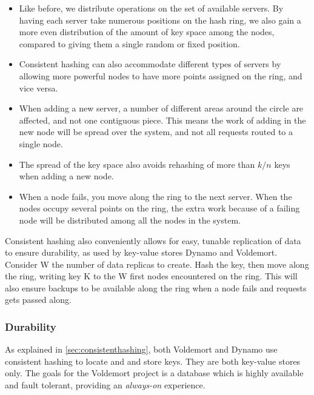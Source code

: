 \begin{itemize}
\item Like before, we distribute operations on the set of available servers. By having each server take numerous positions on the hash ring, we also gain a more even distribution of the amount of key space among the nodes, compared to giving them a single random or fixed position.

\item Consistent hashing can also accommodate different types of servers by allowing more powerful nodes to have more points assigned on the ring, and vice versa. 

\item When adding a new server, a number of different areas around the circle are affected, and not one contiguous piece. This means the work of adding in the new node will be spread over the system, and not all requests routed to a single node.

\item The spread of the key space also avoids rehashing of more than $k/n$ keys when adding a new node. 

\item When a node fails, you move along the ring to the next server. When the nodes occupy several points on the ring, the extra work because of a failing node will be distributed among all the nodes in the system.
\end{itemize}

Consistent hashing also conveniently allows for easy, tunable replication of data to ensure durability, as used by key-value stores Dynamo\cite{dynamo} and Voldemort\cite{voldemort}. Consider W the number of data replicas to create. Hash the key, then move along the ring, writing key K to the W first nodes encountered on the ring. This will also ensure backups to be available along the ring when a node fails and requests gets passed along.

\subsubsection{Durability}
As explained in \ref{sec:consistenthashing}, both Voldemort and Dynamo use consistent hashing to locate and and store keys.
They are both key-value stores only.
The goals for the Voldemort project is a database which is highly available and fault tolerant, providing an \emph{always-on} experience.

